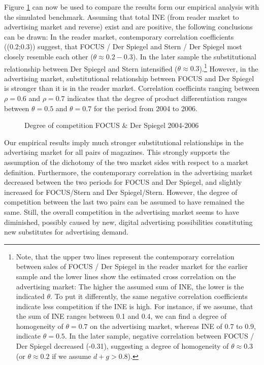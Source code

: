 \documentclass[12pt,a4paper]{scrreprt}
\begin{document}
Figure \ref{fig_QQ_fss} can now be used to compare the results form our empirical analysis with the simulated benchmark. Assuming that total INE (from reader market to advertising market and reverse) exist and are positive, the following conclusions can be drawn: In the reader market, contemporary correlation coefficients (\rho \in (0.2;0.3)) suggest, that FOCUS / Der Spiegel and Stern / Der Spiegel most closely resemble each other ($\theta\approx0.2-0.3$). In the later sample the substitutional relationship between Der Spiegel and Stern intensified ($\theta\approx0.3$).\footnote{Note, that the upper two lines represent the contemporary correlation between sales of FOCUS / Der Spiegel in the reader market for the earlier sample and the lower lines show the estimated cross correlation on the advertising market: The higher the assumed sum of INE, the lower is the indicated $\theta$. To put it differently, the same negative correlation coefficients indicate less competition if the INE is high. For instance, if we assume, that the sum of INE ranges between 0.1 and 0.4, we can find a degree of homogeneity of $\theta=0.7$ on the advertising market, whereas INE of 0.7 to 0.9, indicate $\theta=0.5$. In the later sample, negative correlation between FOCUS / Der Spiegel decreased (-0.31), suggesting a degree of homogeneity of $\theta\approx0.3$ (or $\theta\approx0.2$ if we assume $d+g>0.8$).} 
However, in the advertising market, substitutional relationship between FOCUS and Der Spiegel is stronger than it is in the reader market. Correlation coefficints ranging between $\rho=0.6$ and $\rho=0.7$ indicates that the degree of product differentiation ranges between $\theta=0.5$ and $\theta=0.7$ for the period from 2004 to 2006. 


\begin{figure}[H]
	\centering
	\caption{Degree of competition FOCUS $\&$ Der Spiegel 2004-2006}
	\label{fig_QQ_fss}
	\begin{adjustbox}{width=\textwidth}	
	
\end{adjustbox}
\end{figure}
  
 

Our empirical results imply much stronger substitutional relationships in the advertising market for all pairs of magazines. This strongly supports the assumption of the dichotomy of the two market sides with respect to a market definition. Furthermore, the contemporary correlation in the advertising market decreased between the two periods for FOCUS and Der Spiegel, and slightly increased for FOCUS/Stern and Der Spiegel/Stern. However, the degree of competition between the last two pairs can be assumed to have remained the same. Still, the overall competition in the advertising market seems to have diminished, possibly caused by new, digital advertising possibilities constituting new substitutes for advertising demand. 
\end{document}
